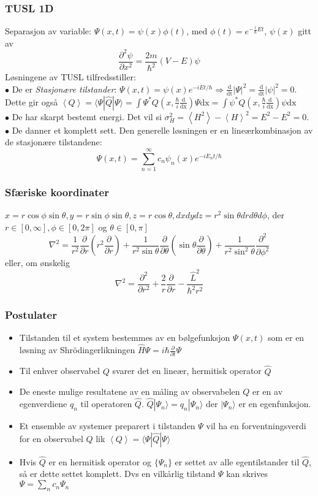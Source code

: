 \documentclass[a4paper, norsk, 8pt]{article}
\newcommand{\PAR}[2]{ \frac{\partial #1}{\partial #2}}
\newcommand{\expe}[1] { \left\langle#1\right\rangle }
\newcommand{\ket}[1] { |#1\rangle }
\newcommand{\bra}[1] { \langle #1 | }
\begin{document}
\begin{multicols*}{3}
\subsubsection*{\scriptsize TUSL 1D}
Separasjon av variable: $\Psi(x,t)=\psi(x)\phi(t)$, med $\phi(t)=e^{-\frac{i}{\hbar}Et}$, $\psi(x)$ gitt av
\[\PAR{^2\psi}{x^2}=\frac{2m}{\hbar^2}(V-E)\psi\]
Løsningene av TUSL tilfredsstiller: \\
$\bullet$ De er \textit{Stasjonære tilstander}: $\Psi(x,t)=\psi(x)e^{-iEt/\hbar} \Rightarrow \frac{\mbox{d}}{\mbox{dt}}|\Psi|^2=\frac{\mbox{d}}{\mbox{dt}}|\psi|^2=0$. Dette gir også $\expe{Q}=\bra{\Psi}\hat{Q}\ket{\Psi}=\int \Psi^* Q(x,\frac{\hbar}{i}\frac{\mbox{d}}{\mbox{dx}})\Psi\mbox{dx}=\int \psi^* Q(x,\frac{\hbar}{i}\frac{\mbox{d}}{\mbox{dx}})\psi\mbox{dx}$ \\
$\bullet$ De har skarpt bestemt energi. Det vil si $\sigma_H^2=\expe{H^2}-\expe{H}^2=E^2-E^2=0$. \\
$\bullet$ De danner et komplett sett. Den generelle løsningen er en lineærkombinasjon av de stasjonære tilstandene:
\[ \Psi(x,t)=\sum_{n=1}^{\infty}c_n\psi_n(x)e^{-iE_nt/\hbar} \]

\subsubsection*{\scriptsize Sfæriske koordinater }
$x=r \cos{\phi} \sin \theta,y=r\sin \phi \sin \theta,z=r\cos\theta,dxdydz=r^2\sin \theta drd\theta d\phi$, der $r\in[0,\infty],\phi\in[0,2\pi]$ og $\theta\in[0,\pi]$
\[
\nabla^2 = \frac{1}{r^2}\PAR{}{r}\left(r^2\PAR{}{r}\right)+\frac{1}{r^2\sin\theta}\PAR{}{\theta}\left(\sin \theta \PAR{}{\theta}\right)+\frac{1}{r^2\sin^2 \theta} \PAR{^2}{\phi^2}
\] 
eller, om ønskelig
\[ \nabla^2 = \PAR{^2}{r^2}+\frac{2}{r}\PAR{}{r}-\frac{\hat{L}^2}{\hbar^2r^2} \]


\subsubsection*{\scriptsize Postulater}
\begin{itemize}
\item Tilstanden til et system bestemmes av en bølgefunksjon $\Psi(x,t)$ som er en løsning av Shrödingerlikningen $\hat{H}\Psi=i\hbar \PAR{}{t}\Psi$
\item Til enhver observabel $Q$ svarer det en lineær, hermitisk operator $\hat{Q}$
\item De eneste mulige resultatene av en måling av observabelen $Q$ er en av egenverdiene $q_n$ til operatoren $\hat{Q}$. $\hat{Q}\ket{\Psi_n}=q_n\ket{\Psi_n}$ der $\ket{\Psi_n}$ er en egenfunksjon.
\item Et ensemble av systemer preparert i tilstanden $\Psi$ vil ha en forventningsverdi for en observabel $Q$ lik $\expe{Q}=\bra{\Psi}\hat{Q}\ket{\Psi}$
\item Hvis $\hat{Q}$ er en hermitisk operator og $\{\Psi_n\}$ er settet av alle egentilstander til $\hat{Q}$, så er dette settet komplett. Dvs en vilkårlig tilstand $\Psi$ kan skrives $\Psi = \sum_n c_n \Psi_n$
\end{itemize}



\end{multicols*}
\end{document}
